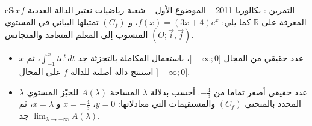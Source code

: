 \documentclass[12pt,a4paper]{article}
\newenvironment{BOX}[2]{\begin{otherlanguage}{english}\begin{arbox}{#1}{#2}}{\end{arbox}\end{otherlanguage}}
\newcounter{exo}
\newenvironment{tamrin}[1]{\stepcounter{exo}\begin{BOX}{cSec}{التمرين \theexo: #1}}{\end{BOX}}
\newcommand{\R}{\mathbb{R}}
\newenvironment{sq}{\begin{itemize}[leftmargin=2.4em,itemsep=3pt]}{\end{itemize}}
\newcommand{\qa}{\item[(أ)]}\newcommand{\qb}{\item[(ب)]}\newcommand{\qc}{\item[(جـ)]}\newcommand{\qd}{\item[(د)]}\newcommand{\qe}{\item[(هـ)]}
\begin{document}
\begin{tamrin}{بكالوريا 2011 -- الموضوع الأول -- شعبة رياضيات}
نعتبر الدالة العددية $f$ المعرفة على $\R$ كما يلي: $f(x)=(3x+4)e^x$، و $(C_f)$ تمثيلها البياني في المستوي المنسوب إلى المعلم المتعامد والمتجانس $(O;\vec i,\vec j)$.
\begin{sq}
\qa $x$ عدد حقيقي من المجال $]-\infty;0]$، باستعمال المكاملة بالتجزئة جد $\displaystyle\int_{-1}^xte^t\,dt$، ثم استنتج دالة أصلية للدالة $f$ على المجال $]-\infty;0]$.
\qb $\lambda$ عدد حقيقي أصغر تماما من $-\frac43$. أحسب بدلالة $\lambda$ المساحة $A(\lambda)$ للحيّز المستوي المحدد بالمنحنى $(C_f)$ والمستقيمات التي معادلاتها: $y=0$، $x=-\frac43$ و $x=\lambda$، ثم جد $\displaystyle\lim_{\lambda\to-\infty}A(\lambda)$.
\end{sq}
\end{tamrin}
\end{document}
